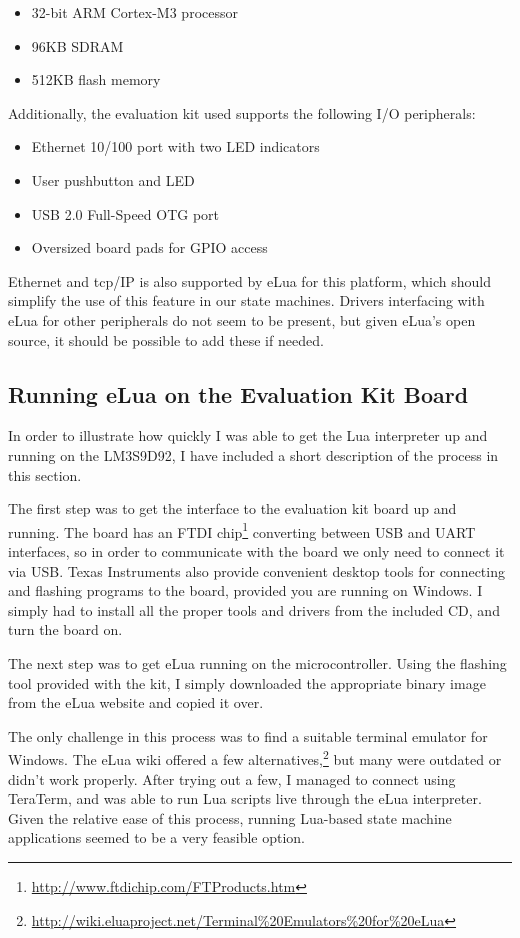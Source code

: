 \begin{itemize}
	\item 32-bit ARM Cortex-M3 processor
	\item 96KB SDRAM
	\item 512KB flash memory
\end{itemize}

\noindent
Additionally, the evaluation kit used supports the following I/O peripherals:

\begin{itemize}
	\item Ethernet 10/100 port with two LED indicators
	\item User pushbutton and LED
	\item USB 2.0 Full-Speed OTG port
	\item Oversized board pads for GPIO access
\end{itemize}

\noindent
Ethernet and \gls{tcp}/IP is also supported by eLua for this platform, which should simplify the use of this feature in our state machines. Drivers interfacing with eLua for other peripherals do not seem to be present, but given eLua's open source, it should be possible to add these if needed.

\subsection{Running eLua on the Evaluation Kit Board}
\label{sec:running_elua}
In order to illustrate how quickly I was able to get the Lua interpreter up and running on the LM3S9D92, I have included a short description of the process in this section.

\noindent
The first step was to get the interface to the evaluation kit board up and running. The board has an FTDI chip\footnote{\url{http://www.ftdichip.com/FTProducts.htm}} converting between USB and UART interfaces, so in order to communicate with the board we only need to connect it via USB. Texas Instruments also provide convenient desktop tools for connecting and flashing programs to the board, provided you are running on Windows. I simply had to install all the proper tools and drivers from the included CD, and turn the board on.

\noindent
The next step was to get eLua running on the microcontroller. Using the flashing tool provided with the kit, I simply downloaded the appropriate binary image from the eLua website and copied it over.

\noindent
The only challenge in this process was to find a suitable terminal emulator for Windows. The eLua wiki offered a few alternatives,\footnote{\url{http://wiki.eluaproject.net/Terminal\%20Emulators\%20for\%20eLua}} but many were outdated or didn't work properly. After trying out a few, I managed to connect using TeraTerm, and was able to run Lua scripts live through the eLua interpreter. Given the relative ease of this process, running Lua-based state machine applications seemed to be a very feasible option.

